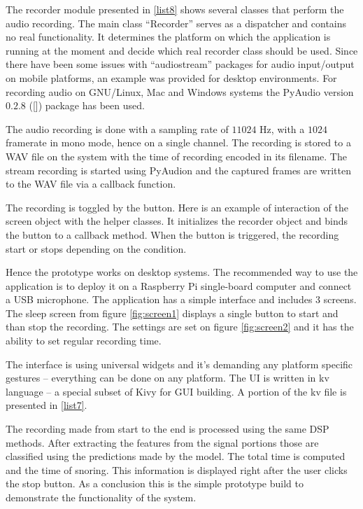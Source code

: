 The recorder module presented in \ref{list8} shows several classes that perform the audio recording. The main class ``Recorder'' serves as a dispatcher and contains no real functionality. It determines the platform on which the application is running at the moment and decide which real recorder class should be used. Since there have been some issues with ``audiostream'' packages for audio input/output on mobile platforms, an example was provided for desktop environments. For recording audio on GNU/Linux, Mac and Windows systems the PyAudio version $0.2.8$ ([\cite{pyaudio}]) package has been used.

The audio recording is done with a sampling rate of $11024$ Hz, with a $1024$ framerate in mono mode, hence on a single channel. The recording is stored to a WAV file on the system with the time of recording encoded in its filename. The stream recording is started using PyAudion and the captured frames are written to the WAV file via a callback function.

The recording is toggled by the button. Here is an example of interaction of the screen object with the helper classes. It initializes the recorder object and binds the button to a callback method. When the button is triggered, the recording start or stops depending on the condition.



Hence the prototype works on desktop systems. The recommended way to use the application is to deploy it on a Raspberry Pi single-board computer and connect a USB microphone. The application has a simple interface and includes 3 screens. The sleep screen from figure \ref{fig:screen1} displays a single button to start and than stop the recording. The settings are set on figure \ref{fig:screen2} and it has the ability to set regular recording time.

The interface is using universal widgets and it's demanding any platform specific gestures -- everything can be done on any platform. The UI is written in kv language -- a special subset of Kivy for GUI building. A portion of the kv file is presented in \ref{list7}.

The recording made from start to the end is processed using the same DSP methods. After extracting the features from the signal portions those are classified using the predictions made by the model. The total time is computed and the time of snoring. This information is displayed right after the user clicks the stop button. As a conclusion this is the simple prototype build to demonstrate the functionality of the system.

